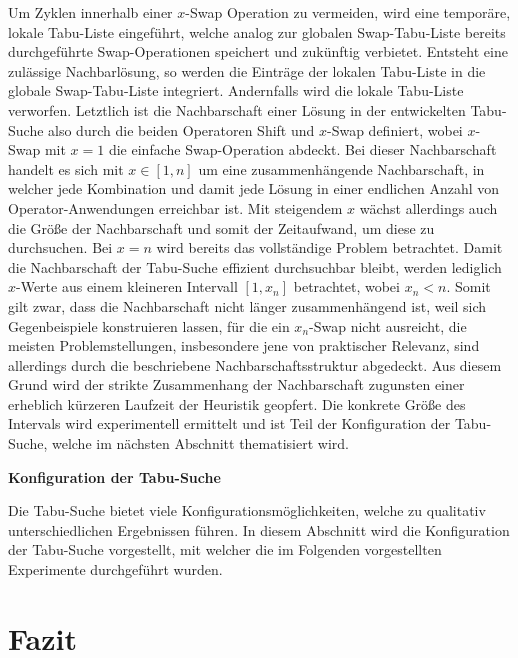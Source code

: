 Um Zyklen innerhalb einer $x$-Swap Operation zu vermeiden, wird eine temporäre, lokale Tabu-Liste eingeführt,
welche analog zur globalen Swap-Tabu-Liste bereits durchgeführte Swap-Operationen speichert und zukünftig verbietet.
Entsteht eine zulässige Nachbarlösung, so werden die Einträge der lokalen Tabu-Liste in die globale Swap-Tabu-Liste
integriert. Andernfalls wird die lokale Tabu-Liste verworfen.
Letztlich ist die Nachbarschaft einer Lösung in der entwickelten Tabu-Suche also durch die beiden Operatoren
Shift und  $x$-Swap definiert, wobei $x$-Swap mit $x = 1$ die einfache Swap-Operation abdeckt.
Bei dieser Nachbarschaft handelt es sich mit $x \in [1, n]$ um eine zusammenhängende Nachbarschaft, in
welcher jede Kombination und damit jede Lösung in einer endlichen Anzahl von Operator-Anwendungen erreichbar ist.
Mit steigendem $x$ wächst allerdings auch die Größe der Nachbarschaft und somit der Zeitaufwand, um diese zu durchsuchen.
Bei $x = n$ wird bereits das vollständige Problem betrachtet.
Damit die Nachbarschaft der Tabu-Suche effizient durchsuchbar bleibt, werden lediglich $x$-Werte aus einem kleineren Intervall
$[1, x_n]$ betrachtet, wobei $x_n < n$. Somit gilt zwar, dass die Nachbarschaft nicht länger zusammenhängend ist, weil sich Gegenbeispiele konstruieren lassen, für die ein $x_n$-Swap nicht ausreicht, die meisten Problemstellungen, insbesondere jene von praktischer Relevanz, sind allerdings durch die beschriebene Nachbarschaftsstruktur abgedeckt. Aus diesem Grund wird der strikte Zusammenhang der Nachbarschaft zugunsten einer erheblich kürzeren Laufzeit der Heuristik geopfert. Die konkrete Größe des Intervals
wird experimentell ermittelt und ist Teil der Konfiguration der Tabu-Suche, welche im nächsten Abschnitt thematisiert wird.

\vfill
\pagebreak

\textbf{Konfiguration der Tabu-Suche}\newline


Die Tabu-Suche bietet viele Konfigurationsmöglichkeiten, welche zu qualitativ unterschiedlichen
Ergebnissen führen. In diesem Abschnitt wird die Konfiguration der Tabu-Suche vorgestellt,
mit welcher die im Folgenden vorgestellten Experimente durchgeführt wurden.


\vfill

\pagebreak

\section{Fazit}
\label{sec:conclusion}
